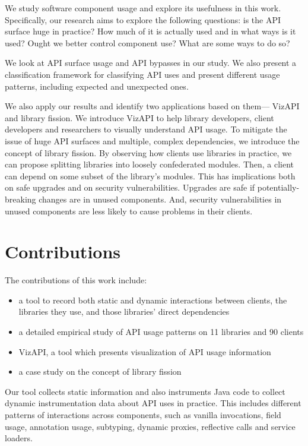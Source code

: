 We study software component usage and explore its usefulness in this work. Specifically, our research aims to explore the following questions: is the API surface huge in practice? How much of it is actually used and in what ways is it used? Ought we better control component use? What are some ways to do so? 

We look at API surface usage and API bypasses in our study. We also present a classification framework for classifying API uses and present different usage patterns, including expected and unexpected ones. 

We also apply our results and identify two applications based on them--- VizAPI and library fission. We introduce VizAPI to help library developers, client developers and researchers to visually understand API usage. To mitigate the issue of huge API surfaces and multiple, complex dependencies, we introduce the concept of library fission. By observing how clients use libraries in practice, we can propose splitting libraries into loosely confederated modules. Then, a client can depend on some subset of the library’s modules. This has implications both on safe upgrades and on security vulnerabilities. Upgrades are
 safe if potentially-breaking changes are in unused components. And, security vulnerabilities in unused components are less likely to cause problems in their clients.

\section{Contributions}
\label{sec:contributions}

The contributions of this work include:
\begin{itemize}
\item a tool to record both static and dynamic interactions between clients, the libraries they use, and those libraries’ direct dependencies
\item a detailed empirical study of API usage patterns on 11 libraries and 90 clients 
\item VizAPI, a tool which presents visualization of API usage information
\item a case study on the concept of library fission
\end{itemize}

Our tool collects static information and also instruments Java code to collect dynamic instrumentation data about API uses in practice. This includes different patterns of interactions across components, such as vanilla invocations, field usage, annotation usage, subtyping, dynamic proxies, reflective calls and service loaders. 

